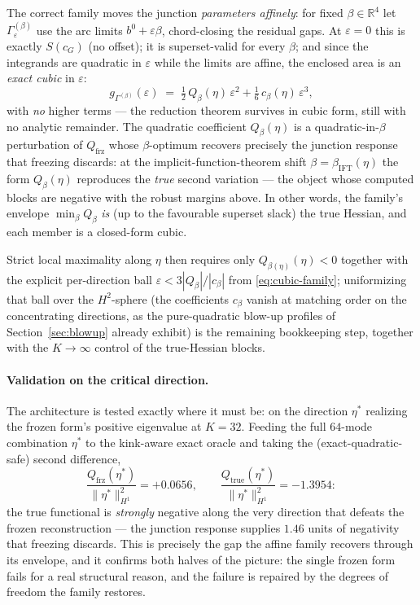 \documentclass[11pt]{amsart}
\theoremstyle{plain}
\theoremstyle{definition}
\newcommand{\R}{\mathbb{R}}
\newcommand{\cG}{c_{G}}
\begin{document}
The correct family moves the junction \emph{parameters affinely}:
for fixed $\beta\in\R^{4}$ let $\Gamma^{(\beta)}_{\varepsilon}$ use
the arc limits $b^{0}+\varepsilon\beta$, chord-closing the residual
gaps.  At $\varepsilon=0$ this is exactly $S(\cG)$ (no offset); it is
superset-valid for every $\beta$; and since the integrands are
quadratic in $\varepsilon$ while the limits are affine, the enclosed
area is an \emph{exact cubic} in $\varepsilon$:
\begin{equation}\label{eq:cubic-family}
   g_{\Gamma^{(\beta)}}(\varepsilon)
   \;=\; \tfrac12\,Q_{\beta}(\eta)\,\varepsilon^{2}
        + \tfrac16\,c_{\beta}(\eta)\,\varepsilon^{3},
\end{equation}
with \emph{no} higher terms --- the reduction theorem survives in
cubic form, still with no analytic remainder.  The quadratic
coefficient $Q_{\beta}(\eta)$ is a quadratic-in-$\beta$ perturbation
of $Q_{\mathrm{frz}}$ whose $\beta$-optimum recovers precisely the
junction response that freezing discards: at the
implicit-function-theorem shift $\beta=\beta_{\mathrm{IFT}}(\eta)$
the form $Q_{\beta}(\eta)$ reproduces the \emph{true} second
variation --- the object whose computed blocks are negative with the
robust margins above.  In other words, the family's envelope
$\min_{\beta}Q_{\beta}$ \emph{is} (up to the favourable superset
slack) the true Hessian, and each member is a closed-form cubic.

Strict local maximality along $\eta$ then requires only
$Q_{\beta(\eta)}(\eta)<0$ together with the explicit per-direction
ball $\varepsilon < 3|Q_{\beta}|/|c_{\beta}|$ from
\eqref{eq:cubic-family}; uniformizing that ball over the
$H^{2}$-sphere (the coefficients $c_{\beta}$ vanish at matching
order on the concentrating directions, as the pure-quadratic blow-up
profiles of Section~\ref{sec:blowup} already exhibit) is the
remaining bookkeeping step, together with the $K\to\infty$ control of
the true-Hessian blocks.

\paragraph{Validation on the critical direction.}
The architecture is tested exactly where it must be: on the
direction $\eta^{*}$ realizing the frozen form's positive eigenvalue
at $K=32$.  Feeding the full $64$-mode combination $\eta^{*}$ to the
kink-aware exact oracle and taking the (exact-quadratic-safe) second
difference,
\[
   \frac{Q_{\mathrm{frz}}(\eta^{*})}{\|\eta^{*}\|^{2}_{H^{1}}}
   = +0.0656 ,
   \qquad
   \frac{Q_{\mathrm{true}}(\eta^{*})}{\|\eta^{*}\|^{2}_{H^{1}}}
   = -1.3954 :
\]
the true functional is \emph{strongly} negative along the very
direction that defeats the frozen reconstruction --- the junction
response supplies $1.46$ units of negativity that freezing discards.
This is precisely the gap the affine family recovers through its
envelope, and it confirms both halves of the picture: the single
frozen form fails for a real structural reason, and the failure is
repaired by the degrees of freedom the family restores.
\end{document}

